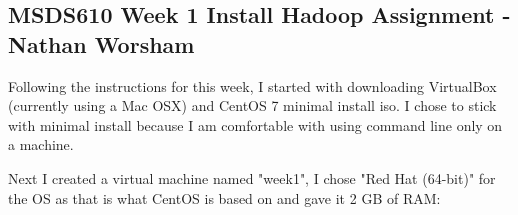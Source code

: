 \documentclass[10pt]{article}
\begin{document}
\subsection*{MSDS610 Week 1 Install Hadoop Assignment - Nathan Worsham}
Following the instructions for this week, I started with downloading VirtualBox (currently using a Mac OSX) and CentOS 7 minimal install iso. I chose to stick with minimal install because I am comfortable with using command line only on a machine. 
\par
{}%
\hfill
{}%
\par
Next I created a virtual machine named "week1", I chose "Red Hat (64-bit)" for the OS as that is what CentOS is based on and gave it 2 GB of RAM:
\par
{}%
\hfill
{}%
\end{document}
